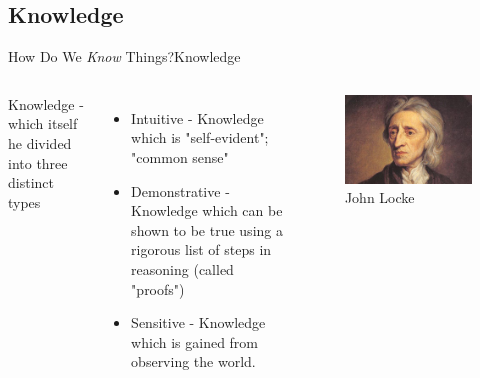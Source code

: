 \subsection{Knowledge}
\begin{frame}{How Do We \textit{Know} Things?}{Knowledge}

	\begin{columns}[T]
		Knowledge - which itself he divided into three distinct types
		\begin{itemize}
			\item Intuitive - Knowledge which is "self-evident"; "common sense"
			\item Demonstrative - Knowledge which can be shown to be true using a rigorous list of steps in reasoning (called "proofs")
			\item Sensitive - Knowledge which is gained from observing the world.%
		\end{itemize}
		\begin{figure}
			\centering
			\includegraphics[width=\textwidth]{images/locke.jpg}
			\caption{John Locke}
		\end{figure}
	\end{columns}

 \end{frame}
